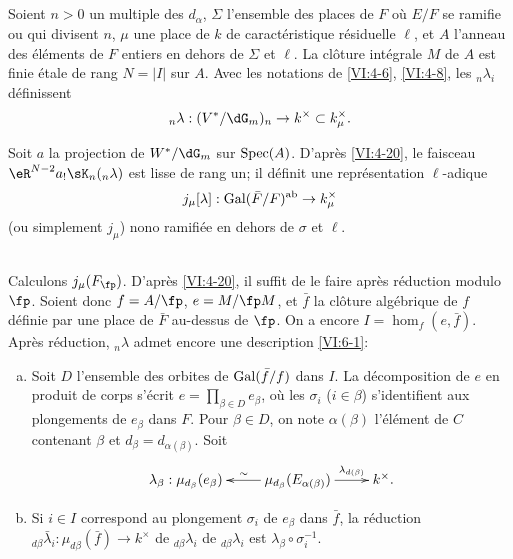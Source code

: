 \subsection{}\label{VI:6-2}

Soient $n>0$ un multiple des $d_\alpha$, $\Sigma$ l'ensemble des places de $F$ 
où $E/F$ se ramifie ou qui divisent $n$, $\mu$ une place de $k$ de 
caractéristique résiduelle $\ell$, et $A$ l'anneau des éléments de $F$ 
entiers en dehors de $\Sigma$ et $\ell$. La clôture intégrale $M$ de $A$ 
est finie étale de rang $N=|I|$ sur $A$. Avec les notations de \ref{VI:4-6}, 
\ref{VI:4-8}, les $_n \lambda_i$ définissent 
\[
  _n\lambda:(V^\ast/\dG_m)_n \to k^\times \subset k_\mu^\times \text{.} 
\]

Soit $a$ la projection de $W^\ast/\dG_m$ sur $\operatorname{Spec}(A)$. D'après 
\ref{VI:4-20}, le faisceau $\eR^{N-2} a_! \sK_n(_n \lambda)$ est lisse de rang 
un; il définit une représentation $\ell$-adique 
\[
  j_\mu[\lambda]:\operatorname{Gal}(\bar F/F)^\text{ab} \to k_\mu^\times 
\]
(ou simplement $j_\mu$) nono ramifiée en dehors de $\sigma$ et $\ell$. 





\subsection{}\label{VI:6-3}

Calculons $j_\mu(F_\fp)$. D'après \ref{VI:4-20}, il suffit de le faire 
après réduction modulo $\fp$. Soient donc $f=A/\fp$, $e=M/\fp  M$, et 
$\bar f$ la clôture algébrique de $f$ définie par une place de $\bar F$ 
au-dessus de $\fp$. On a encore $I=\hom_f(e,\bar f)$. Après réduction, 
$_n\lambda$ admet encore une description \ref{VI:6-1}: 
\begin{enumerate}[a)]
  \item Soit $D$ l'ensemble des orbites de $\operatorname{Gal}(\bar f/f)$ dans $I$. La 
    décomposition de $e$ en produit de corps s'écrit 
    $e=\prod_{\beta\in D} e_\beta$, où les $\sigma_i$ ($i\in \beta$) 
    s'identifient aux plongements de $e_\beta$ dans $F$. Pour $\beta\in D$, on 
    note $\alpha(\beta)$ l'élément de $C$ contenant $\beta$ et 
    $d_\beta=d_{\alpha(\beta)}$. Soit 
    \[\xymatrix{
      \lambda_\beta : \mu_{d_\beta}(e_\beta) 
        & \ar[l]_-\sim \mu_{d_\beta}(E_{\alpha(\beta)}) \ar[r]^-{\lambda_{d(\beta)}} 
        & k^\times \text{.} 
    }\]
  \item Si $i\in I$ correspond au plongement $\sigma_i$ de $e_\beta$ dans 
    $\bar f$, la réduction 
    $_{d\beta} \bar\lambda_i:\mu_{d\beta}(\bar f) \to k^\times$ de 
    $_{d\beta} \lambda_i$ de $_{d\beta} \lambda_i$ est 
    $\lambda_\beta \circ \sigma_i^{-1}$. 
\end{enumerate}

